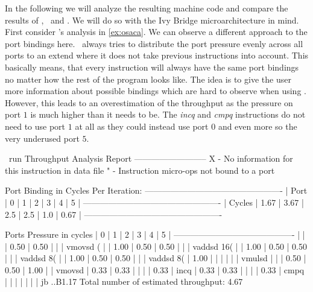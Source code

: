 In the following we will analyze the resulting machine code and compare the results of \iaca, \osaca\ and \suaca. We will do so with the Ivy Bridge microarchitecture in mind. First consider \osaca's analysis in \autoref{ex:osaca}. We can observe a different approach to the port bindings here. \osaca\ always tries to distribute the port pressure evenly across all ports to an extend where it does not take previous instructions into account. This basically means, that every instruction will always have the same port bindings no matter how the rest of the program looks like. The idea is to give the user more information about possible bindings which are hard to observe when using \iaca. However, this leads to an overestimation of the throughput as the pressure on port $1$ is much higher than it needs to be. The \emph{incq} and \emph{cmpq} instructions do not need to use port $1$ at all as they could instead use port $0$ and even more so the very underused port $5$. 


\begin{LabeledExample}{\osaca\ run}{\label{ex:osaca}}
    Throughput Analysis Report
    --------------------------
    X - No information for this instruction in data file
    " - Instruction micro-ops not bound to a port
    
    Port Binding in Cycles Per Iteration:
    -------------------------------------------------
    | Port   |   0  |   1  |  2  |  3  |  4  |   5  |
    -------------------------------------------------
    | Cycles | 1.67 | 3.67 | 2.5 | 2.5 | 1.0 | 0.67 |
    -------------------------------------------------
    
    Ports Pressure in cycles
    |   0  |   1  |   2  |   3  |   4  |   5  |
    -------------------------------------------
    |      |      | 0.50 | 0.50 |      |      | vmovsd  (%
    |      | 1.00 | 0.50 | 0.50 |      |      | vaddsd  16(%
    |      | 1.00 | 0.50 | 0.50 |      |      | vaddsd  8(%
    |      | 1.00 | 0.50 | 0.50 |      |      | vaddsd  8(%
    | 1.00 |      |      |      |      |      | vmulsd  %
    |      |      | 0.50 | 0.50 | 1.00 |      | vmovsd  %
    | 0.33 | 0.33 |      |      |      | 0.33 | incq    %
    | 0.33 | 0.33 |      |      |      | 0.33 | cmpq    %
    |      |      |      |      |      |      | jb      ..B1.17
    Total number of estimated throughput: 4.67
\end{LabeledExample}

